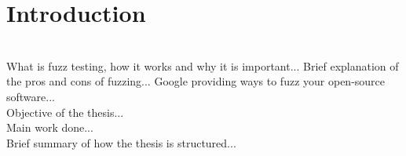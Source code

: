\chapter{Introduction}
\ \\
What is fuzz testing, how it works and why it is important...
\newline \newline
Brief explanation of the pros and cons of fuzzing...
\newline \newline
Google providing ways to fuzz your open-source software...
\newline \ \\
Objective of the thesis...
\newline \ \\
Main work done...
\newline \ \\
Brief summary of how the thesis is structured...




